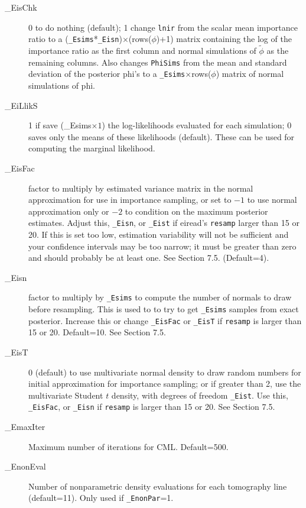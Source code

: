\documentclass[11pt,titlepage]{article}
\begin{document}
\begin{description}
\item[\_EisChk] 0 to do nothing (default); 1 change \texttt{lnir} from
  the scalar mean importance ratio to a
  (\texttt{\_Esims}*\texttt{\_Eisn})$\times$(rows($\phi$)+1) matrix
  containing the log of the importance ratio as the first column and
  normal simulations of $\tilde{\phi}$ as the remaining columns.  Also
  changes \texttt{PhiSims} from the mean and standard deviation of the
  posterior phi's to a \texttt{\_Esims}$\times$rows($\phi$) matrix of
  normal simulations of phi.

\item[\_EiLlikS] 1 if save (\_Esims$\times 1$) the log-likelihoods
  evaluated for each simulation; 0 saves only the means of these
  likelihoods (default).  These can be used for computing the marginal
  likelihood.
  
\item[\_EisFac] factor to multiply by estimated variance matrix in the
  normal approximation for use in importance sampling, or set to $-1$
  to use normal approximation only or $-2$ to condition on the maximum
  posterior estimates.  Adjust this, \texttt{\_Eisn}, or
  \texttt{\_Eist} if eiread's \texttt{resamp} larger than 15 or 20.
  If this is set too low, estimation variability will not be
  sufficient and your confidence intervals may be too narrow; it must
  be greater than zero and should probably be at least one.  See
  Section 7.5. (Default=4).

\item[\_Eisn] factor to multiply by \texttt{\_Esims} to compute the
  number of normals to draw before resampling.  This is used to to try
  to get \texttt{\_Esims} samples from exact posterior.  Increase this
  or change \texttt{\_EisFac} or \texttt{\_EisT} if \texttt{resamp} is
  larger than 15 or 20.  Default=10.  See Section 7.5.

\item[\_EisT] 0 (default) to use multivariate normal density to draw
  random numbers for initial approximation for importance sampling; or
  if greater than 2, use the multivariate Student $t$ density, with
  degrees of freedom \texttt{\_Eist}.  Use this, \texttt{\_EisFac}, or
  \texttt{\_Eisn} if \texttt{resamp} is larger than 15 or 20.  See
  Section 7.5.

\item[\_EmaxIter] Maximum number of iterations for CML.  Default=500.

\item[\_EnonEval] Number of nonparametric density evaluations for each
  tomography line (default=11).  Only used if \texttt{\_EnonPar}=1.


\end{description}
\end{document}
